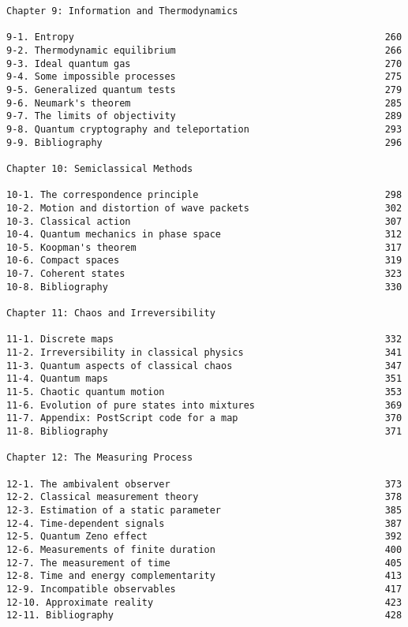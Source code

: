 \begin{verbatim}
Chapter 9: Information and Thermodynamics  
 
9-1. Entropy                                                       260 
9-2. Thermodynamic equilibrium                                     266 
9-3. Ideal quantum gas                                             270 
9-4. Some impossible processes                                     275 
9-5. Generalized quantum tests                                     279 
9-6. Neumark's theorem                                             285 
9-7. The limits of objectivity                                     289 
9-8. Quantum cryptography and teleportation                        293 
9-9. Bibliography                                                  296
 
Chapter 10: Semiclassical Methods  
 
10-1. The correspondence principle                                 298 
10-2. Motion and distortion of wave packets                        302 
10-3. Classical action                                             307 
10-4. Quantum mechanics in phase space                             312 
10-5. Koopman's theorem                                            317 
10-6. Compact spaces                                               319 
10-7. Coherent states                                              323 
10-8. Bibliography                                                 330
 
Chapter 11: Chaos and Irreversibility  
 
11-1. Discrete maps                                                332 
11-2. Irreversibility in classical physics                         341 
11-3. Quantum aspects of classical chaos                           347 
11-4. Quantum maps                                                 351 
11-5. Chaotic quantum motion                                       353 
11-6. Evolution of pure states into mixtures                       369 
11-7. Appendix: PostScript code for a map                          370 
11-8. Bibliography                                                 371

Chapter 12: The Measuring Process  
 
12-1. The ambivalent observer                                      373 
12-2. Classical measurement theory                                 378 
12-3. Estimation of a static parameter                             385 
12-4. Time-dependent signals                                       387 
12-5. Quantum Zeno effect                                          392 
12-6. Measurements of finite duration                              400 
12-7. The measurement of time                                      405 
12-8. Time and energy complementarity                              413 
12-9. Incompatible observables                                     417 
12-10. Approximate reality                                         423 
12-11. Bibliography                                                428
\end{verbatim}
    

